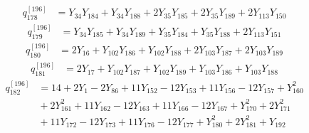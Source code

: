 \begin{equation}\label{q196:row:178}
\begin{aligned}
q_{178}^{[196]} &={} Y_{34}Y_{184} + Y_{34}Y_{188} + 2Y_{35}Y_{185} + 2Y_{35}Y_{189} + 2Y_{113}Y_{150}
\end{aligned}
\end{equation}
\begin{equation}\label{q196:row:179}
\begin{aligned}
q_{179}^{[196]} &={} Y_{34}Y_{185} + Y_{34}Y_{189} + Y_{35}Y_{184} + Y_{35}Y_{188} + 2Y_{113}Y_{151}
\end{aligned}
\end{equation}
\begin{equation}\label{q196:row:180}
\begin{aligned}
q_{180}^{[196]} &={} 2Y_{16} + Y_{102}Y_{186} + Y_{102}Y_{188} + 2Y_{103}Y_{187} + 2Y_{103}Y_{189}
\end{aligned}
\end{equation}
\begin{equation}\label{q196:row:181}
\begin{aligned}
q_{181}^{[196]} &={} 2Y_{17} + Y_{102}Y_{187} + Y_{102}Y_{189} + Y_{103}Y_{186} + Y_{103}Y_{188}
\end{aligned}
\end{equation}
\begin{equation}\label{q196:row:182}
\begin{aligned}
q_{182}^{[196]} &={} 14 + 2Y_{1} - 2Y_{86} + 11Y_{152} - 12Y_{153} + 11Y_{156} - 12Y_{157} + Y_{160}^{2}\\
&{} + 2Y_{161}^{2} + 11Y_{162} - 12Y_{163} + 11Y_{166} - 12Y_{167} + Y_{170}^{2} + 2Y_{171}^{2}\\
&{} + 11Y_{172} - 12Y_{173} + 11Y_{176} - 12Y_{177} + Y_{180}^{2} + 2Y_{181}^{2} + Y_{192}
\end{aligned}
\end{equation}
